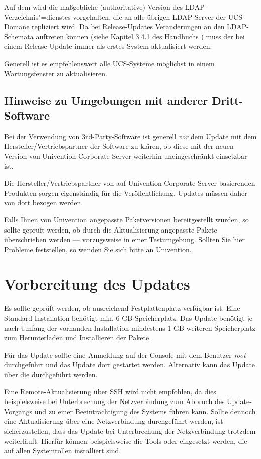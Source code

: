 
Auf dem \ucsMaster{} wird die maßgebliche (authoritative) Version des
LDAP-Verzeichnis"=dienstes vorgehalten, die an alle übrigen LDAP-Server
der UCS-Domäne repliziert wird. Da bei Release-Updates Veränderungen
an den LDAP-Schemata auftreten können (siehe
Kapitel 3.4.1 des Handbuchs \cite{UCS-Handbuch}) muss der \ucsMaster{} bei einem
Release-Update immer als erstes System aktualisiert werden.

Generell ist es empfehlenswert alle UCS-Systeme möglichst in einem
Wartungsfenster zu aktualisieren.

\section{Hinweise zu Umgebungen mit anderer Dritt-Software}

Bei der Verwendung von 3rd-Party-Software ist generell \emph{vor} dem Update
mit dem Hersteller/Vertriebspartner der Software zu klären, ob
diese mit der neuen Version von Univention Corporate Server weiterhin
uneingeschränkt einsetzbar ist. 

Die Hersteller/Vertriebspartner von auf Univention Corporate Server
basierenden Produkten sorgen eigenständig für die Veröffentlichung. Updates
müssen daher von dort bezogen werden.

Falls Ihnen von Univention angepasste Paketversionen bereitgestellt wurden, so
sollte geprüft werden, ob durch die Aktualisierung angepasste Pakete
überschrieben werden --- vorzugsweise in einer Testumgebung. Sollten Sie hier
Probleme feststellen, so wenden Sie sich bitte an Univention.

\chapter{Vorbereitung des Updates}
Es sollte geprüft werden, ob ausreichend Festplattenplatz verfügbar ist. Eine
Standard-Installation benötigt min. 6 GB Speicherplatz. Das
Update benötigt je nach Umfang der vorhanden Installation mindestens 1 GB
weiteren Speicherplatz zum Herunterladen und Installieren der Pakete.

Für das Update sollte eine Anmeldung auf der Console mit dem
Benutzer \emph{root} durchgeführt und das Update dort gestartet werden.
Alternativ kann das Update über die \ucsUMC{} durchgeführt werden.

Eine Remote-Aktualisierung über SSH wird nicht empfohlen, da dies
beispielsweise bei Unterbrechung der Netzverbindung zum Abbruch des
Update-Vorgangs und zu einer Beeinträchtigung des Systems führen kann. Sollte
dennoch eine Aktualisierung über eine Netzverbindung durchgeführt werden, ist
sicherzustellen, dass das Update bei Unterbrechung der Netzverbindung trotzdem
weiterläuft. Hierfür können beispielsweise die Tools  oder
 eingesetzt werden, die auf allen Systemrollen installiert sind.

